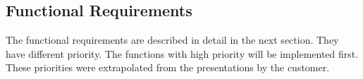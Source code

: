 \subsection{Functional Requirements}
The functional requirements are described in detail in the next section. They have different priority. The functions with high priority will be implemented first. These priorities were extrapolated from the presentations by the customer.
